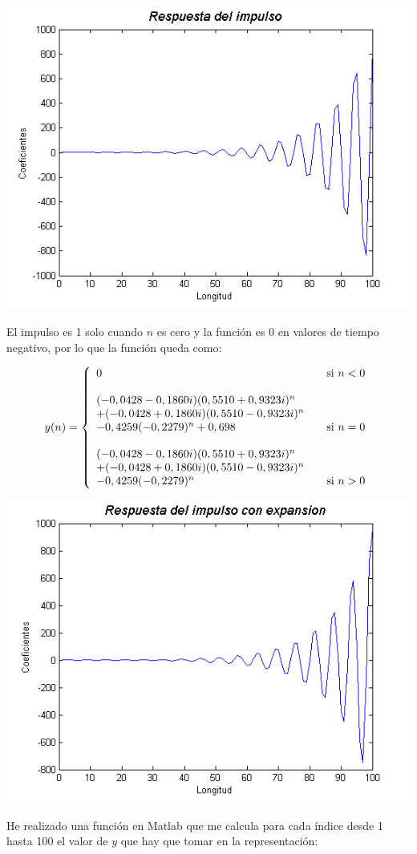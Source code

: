 \documentclass[a4paper,12pt]{article}
\begin{document}
\begin{center}
\includegraphics[width=.8 \textwidth]{ejercicio-5-c-1.png}
\end{center}

El impulso es 1 solo cuando $n$ es cero y la función es 0 en valores de tiempo negativo, por lo que la función queda como:

\[ y(n) = \left\{ 
  \begin{array}{l l}
    0 & \quad \text{si } n < 0 \\
    & \\
    (-0,0428 - 0,1860i)(0,5510 + 0,9323i)^n & \quad \\
    + (-0,0428 + 0,1860i)(0,5510 - 0,9323i)^n & \quad \\
    - 0,4259(-0,2279)^n  + 0,698 & \quad \text{si } n = 0 \\
    & \\
    (-0,0428 - 0,1860i)(0,5510 + 0,9323i)^n & \quad \\
    + (-0,0428 + 0,1860i)(0,5510 - 0,9323i)^n & \quad \\
    - 0,4259(-0,2279)^n  & \quad \text{si } n > 0
  \end{array} \right.\]

\begin{center}
\includegraphics[width=.8 \textwidth]{ejercicio-5-c-2.png}
\end{center}



He realizado una función en Matlab que me calcula para cada índice desde 1 hasta 100 el valor de $y$ que hay que tomar en la representación: 


\end{document}

